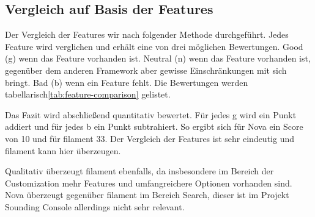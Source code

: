 \subsection{Vergleich auf Basis der Features}

\newpage

Der Vergleich der Features wir nach folgender Methode durchgeführt.
Jedes Feature wird verglichen und erhält eine von drei möglichen Bewertungen.
Good (g) wenn das Feature vorhanden ist.
Neutral (n) wenn das Feature vorhanden ist, gegenüber dem anderen Framework aber gewisse Einschränkungen mit sich bringt.
Bad (b) wenn ein Feature fehlt.
Die Bewertungen werden tabellarisch\ref{tab:feature-comparison} gelistet.

Das Fazit wird abschließend quantitativ bewertet.
Für jedes g wird ein Punkt addiert und für jedes b ein Punkt subtrahiert.
So ergibt sich für Nova ein Score von 10 und für filament 33.
Der Vergleich der Features ist sehr eindeutig und filament kann hier überzeugen.

Qualitativ überzeugt filament ebenfalls, da insbesondere im Bereich der Customization mehr Features und umfangreichere Optionen vorhanden sind.
Nova überzeugt gegenüber filament im Bereich Search, dieser ist im Projekt Sounding Console allerdings nicht sehr relevant.
